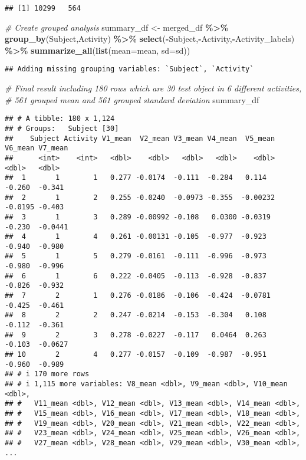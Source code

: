 \documentclass[
]{article}
\newenvironment{Shaded}{\begin{snugshade}}{\end{snugshade}}
\newcommand{\AttributeTok}[1]{\textcolor[rgb]{0.13,0.29,0.53}{#1}}
\newcommand{\CommentTok}[1]{\textcolor[rgb]{0.56,0.35,0.01}{\textit{#1}}}
\newcommand{\FunctionTok}[1]{\textcolor[rgb]{0.13,0.29,0.53}{\textbf{#1}}}
\newcommand{\NormalTok}[1]{#1}
\newcommand{\OtherTok}[1]{\textcolor[rgb]{0.56,0.35,0.01}{#1}}
\newcommand{\SpecialCharTok}[1]{\textcolor[rgb]{0.81,0.36,0.00}{\textbf{#1}}}
\begin{document}
\begin{verbatim}
## [1] 10299   564
\end{verbatim}

\begin{Shaded}
\begin{Highlighting}[]
\CommentTok{\# Create grouped analysis}
\NormalTok{summary\_df }\OtherTok{\textless{}{-}}\NormalTok{ merged\_df }\SpecialCharTok{\%\textgreater{}\%} \FunctionTok{group\_by}\NormalTok{(Subject,Activity) }\SpecialCharTok{\%\textgreater{}\%}
    \FunctionTok{select}\NormalTok{(}\SpecialCharTok{{-}}\NormalTok{Subject,}\SpecialCharTok{{-}}\NormalTok{Activity,}\SpecialCharTok{{-}}\NormalTok{Activity\_labels) }\SpecialCharTok{\%\textgreater{}\%} 
    \FunctionTok{summarize\_all}\NormalTok{(}\FunctionTok{list}\NormalTok{(}\AttributeTok{mean=}\NormalTok{mean, }\AttributeTok{sd=}\NormalTok{sd))}
\end{Highlighting}
\end{Shaded}

\begin{verbatim}
## Adding missing grouping variables: `Subject`, `Activity`
\end{verbatim}

\begin{Shaded}
\begin{Highlighting}[]
\CommentTok{\# Final result including 180 rows which are 30 test object in 6 different activities,}
\CommentTok{\# 561 grouped mean  and 561 grouped standard deviation}
\NormalTok{summary\_df}
\end{Highlighting}
\end{Shaded}

\begin{verbatim}
## # A tibble: 180 x 1,124
## # Groups:   Subject [30]
##    Subject Activity V1_mean  V2_mean V3_mean V4_mean  V5_mean V6_mean V7_mean
##      <int>    <int>   <dbl>    <dbl>   <dbl>   <dbl>    <dbl>   <dbl>   <dbl>
##  1       1        1   0.277 -0.0174  -0.111  -0.284   0.114   -0.260  -0.341 
##  2       1        2   0.255 -0.0240  -0.0973 -0.355  -0.00232 -0.0195 -0.403 
##  3       1        3   0.289 -0.00992 -0.108   0.0300 -0.0319  -0.230  -0.0441
##  4       1        4   0.261 -0.00131 -0.105  -0.977  -0.923   -0.940  -0.980 
##  5       1        5   0.279 -0.0161  -0.111  -0.996  -0.973   -0.980  -0.996 
##  6       1        6   0.222 -0.0405  -0.113  -0.928  -0.837   -0.826  -0.932 
##  7       2        1   0.276 -0.0186  -0.106  -0.424  -0.0781  -0.425  -0.461 
##  8       2        2   0.247 -0.0214  -0.153  -0.304   0.108   -0.112  -0.361 
##  9       2        3   0.278 -0.0227  -0.117   0.0464  0.263   -0.103  -0.0627
## 10       2        4   0.277 -0.0157  -0.109  -0.987  -0.951   -0.960  -0.989 
## # i 170 more rows
## # i 1,115 more variables: V8_mean <dbl>, V9_mean <dbl>, V10_mean <dbl>,
## #   V11_mean <dbl>, V12_mean <dbl>, V13_mean <dbl>, V14_mean <dbl>,
## #   V15_mean <dbl>, V16_mean <dbl>, V17_mean <dbl>, V18_mean <dbl>,
## #   V19_mean <dbl>, V20_mean <dbl>, V21_mean <dbl>, V22_mean <dbl>,
## #   V23_mean <dbl>, V24_mean <dbl>, V25_mean <dbl>, V26_mean <dbl>,
## #   V27_mean <dbl>, V28_mean <dbl>, V29_mean <dbl>, V30_mean <dbl>, ...
\end{verbatim}
\end{document}
